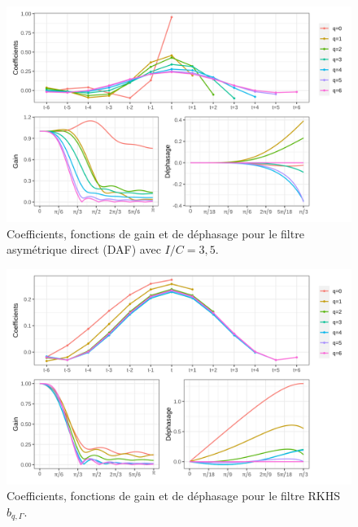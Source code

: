 \documentclass[
  12pt,
  french,
  12pt,a4paper]{article}
\newcommand\1{\mathds{1}}
\begin{document}
\begin{figure}[H]

{\centering \includegraphics[width=1\linewidth]{img/filters_used/daf} 

}

\caption[Coefficients, fonctions de gain et de déphasage pour le filtre asymétrique direct (DAF) avec \(I/C=3,5\)]{Coefficients, fonctions de gain et de déphasage pour le filtre asymétrique direct (DAF) avec \(I/C=3,5\).}\label{fig:graphsdaf}

\footnotesize
\normalsize\end{figure}

\begin{figure}[H]

{\centering \includegraphics[width=1\linewidth]{img/filters_used/frf} 

}

\caption[Coefficients, fonctions de gain et de déphasage pour le filtre RKHS \(b_{q,\Gamma}\)]{Coefficients, fonctions de gain et de déphasage pour le filtre RKHS \(b_{q,\Gamma}\).}\label{fig:graphsrkhsfrf}

\footnotesize
\normalsize\end{figure}
\end{document}
